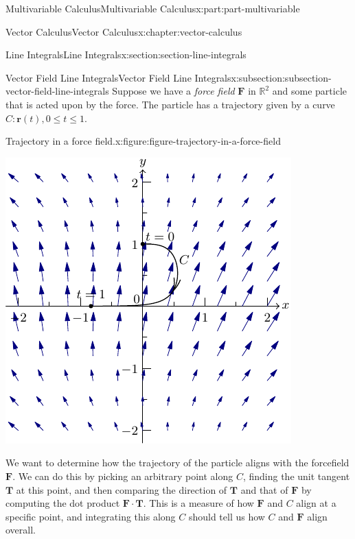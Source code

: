 \documentclass[twoside,10pt,]{book}
\numberwithin{equation}{part}
\newcommand{\RR}{\mathbb{R}}
\newcommand{\vb}[1]{\mathbf{#1}}
\begin{document}
\begin{partptx}{Multivariable Calculus}{}{Multivariable Calculus}{}{}{x:part:part-multivariable}
\begin{chapterptx}{Vector Calculus}{}{Vector Calculus}{}{}{x:chapter:vector-calculus}
\begin{sectionptx}{Line Integrals}{}{Line Integrals}{}{}{x:section:section-line-integrals}
%
%
\typeout{************************************************}
\typeout{************************************************}
%
\begin{subsectionptx}{Vector Field Line Integrals}{}{Vector Field Line Integrals}{}{}{x:subsection:subsection-vector-field-line-integrals}
Suppose we have a \emph{force field} \(\vb{F}\) in \(\RR^{2}\) and some particle that is acted upon by the force. The particle has a trajectory given by a curve \(C: \vb{r}(t), 0\leq t\leq 1\). \begin{figureptx}{Trajectory in a force field.}{x:figure:figure-trajectory-in-a-force-field}{}%
\begin{image}{0}{1}{0}%
\includegraphics[width=\linewidth]{generated/asymptote/image-trajectory-in-a-force-field.pdf}
\end{image}%
\tcblower
\end{figureptx}%
%
\par
We want to determine how the trajectory of the particle aligns with the forcefield \(\vb{F}\). We can do this by picking an arbitrary point along \(C\), finding the unit tangent \(\vb{T}\) at this point, and then comparing the direction of \(\vb{T}\) and that of \(\vb{F}\) by computing the dot product \(\vb{F}\cdot\vb{T}\). This is a measure of how \(\vb{F}\) and \(C\) align at a specific point, and integrating this along \(C\) should tell us how \(C\) and \(\vb{F}\) align overall.%

\end{subsectionptx}
\end{sectionptx}
\end{chapterptx}
\end{partptx}
\end{document}
